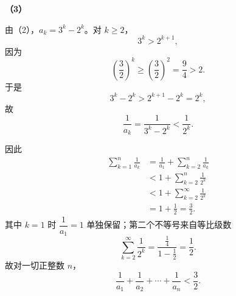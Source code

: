 \begin{answer}
\textbf{（3）}

由（2），$a_k=3^k-2^k$。对 $k\geqslant2$，
\nopagebreak[4]
\[3^k>2^{k+1},\]
因为
\nopagebreak[4]
\[\left(\frac32\right)^k\geqslant\left(\frac32\right)^2=\frac94>2.\]
于是
\nopagebreak[4]
\[3^k-2^k>2^{k+1}-2^k=2^k,\]
故
\nopagebreak[4]
\[\frac1{a_k}=\frac1{3^k-2^k}<\frac1{2^k}.\]

因此
\nopagebreak[4]
\[\begin{aligned}
\sum_{k=1}^n\frac1{a_k}
&=\frac1{a_1}+\sum_{k=2}^n\frac1{a_k}\\
&<1+\sum_{k=2}^n\frac1{2^k}\\
&<1+\sum_{k=2}^{\infty}\frac1{2^k}\\
&=1+\frac12=\frac32.
\end{aligned}\]
其中 $k=1$ 时 $\dfrac1{a_1}=1$ 单独保留；第二个不等号来自等比级数
\nopagebreak[4]
\[\sum_{k=2}^{\infty}\frac1{2^k}=\frac{\frac14}{1-\frac12}=\frac12.\]
故对一切正整数 $n$，
\nopagebreak[4]
\[\frac1{a_1}+\frac1{a_2}+\cdots+\frac1{a_n}<\frac32.\]




\end{answer}
